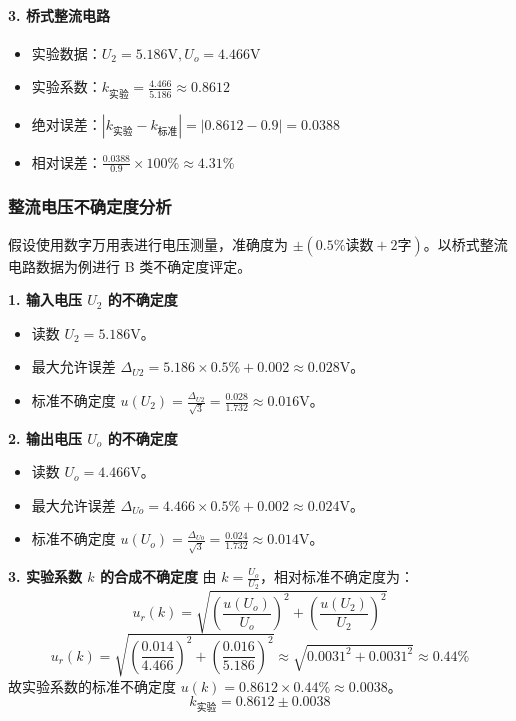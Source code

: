 \documentclass[]{../template/Report}%
\begin{document}
\begin{fullreportonly}
    \paragraph{3. 桥式整流电路}
    \begin{itemize}
        \item 实验数据：$U_2 = 5.186\text{V}, U_o = 4.466\text{V}$
        \item 实验系数：$k_{\text{实验}} = \frac{4.466}{5.186} \approx 0.8612$
        \item 绝对误差：$|k_{\text{实验}} - k_{\text{标准}}| = |0.8612 - 0.9| = 0.0388$
        \item 相对误差：$\frac{0.0388}{0.9} \times 100\% \approx 4.31\%$
    \end{itemize}

    \subsubsection{整流电压不确定度分析}
    假设使用数字万用表进行电压测量，准确度为 $\pm(0.5\% \text{读数} + 2\text{字})$。以桥式整流电路数据为例进行 B 类不确定度评定。

    \textbf{1. 输入电压 $U_2$ 的不确定度}
    \begin{itemize}
        \item 读数 $U_2 = 5.186\text{V}$。
        \item 最大允许误差 $\Delta_{U2} = 5.186 \times 0.5\% + 0.002 \approx 0.028\text{V}$。
        \item 标准不确定度 $u(U_2) = \frac{\Delta_{U2}}{\sqrt{3}} = \frac{0.028}{1.732} \approx 0.016\text{V}$。
    \end{itemize}

    \textbf{2. 输出电压 $U_o$ 的不确定度}
    \begin{itemize}
        \item 读数 $U_o = 4.466\text{V}$。
        \item 最大允许误差 $\Delta_{Uo} = 4.466 \times 0.5\% + 0.002 \approx 0.024\text{V}$。
        \item 标准不确定度 $u(U_o) = \frac{\Delta_{Uo}}{\sqrt{3}} = \frac{0.024}{1.732} \approx 0.014\text{V}$。
    \end{itemize}

    \textbf{3. 实验系数 $k$ 的合成不确定度}
    由 $k = \frac{U_o}{U_2}$，相对标准不确定度为：
    $$ u_r(k) = \sqrt{\left(\frac{u(U_o)}{U_o}\right)^2 + \left(\frac{u(U_2)}{U_2}\right)^2} $$
    $$ u_r(k) = \sqrt{\left(\frac{0.014}{4.466}\right)^2 + \left(\frac{0.016}{5.186}\right)^2} \approx \sqrt{0.0031^2 + 0.0031^2} \approx 0.44\% $$
    故实验系数的标准不确定度 $u(k) = 0.8612 \times 0.44\% \approx 0.0038$。
    $$ k_{\text{实验}} = 0.8612 \pm 0.0038 $$


\end{fullreportonly}
\end{document}
